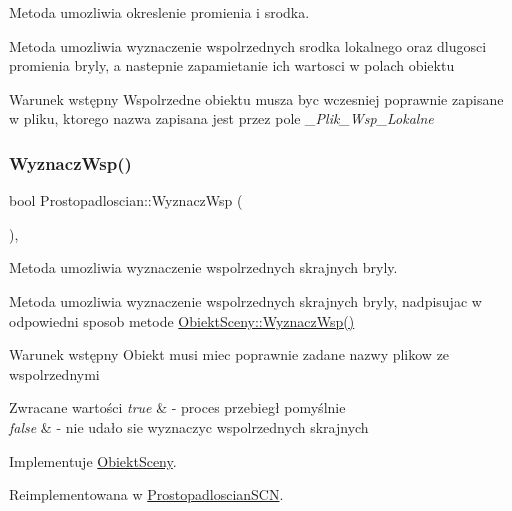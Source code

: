 Metoda umozliwia okreslenie promienia i srodka. 

Metoda umozliwia wyznaczenie wspolrzednych srodka lokalnego oraz dlugosci promienia bryly, a nastepnie zapamietanie ich wartosci w polach obiektu \begin{DoxyPrecond}{Warunek wstępny}
Wspolrzedne obiektu musza byc wczesniej poprawnie zapisane w pliku, ktorego nazwa zapisana jest przez pole {\itshape \+\_\+\+Plik\+\_\+\+Wsp\+\_\+\+Lokalne} 
\end{DoxyPrecond}
\mbox{\label{classProstopadloscian_a9d182fd3d875a1e3928c8972727be6fe}} 
\subsubsection{\texorpdfstring{Wyznacz\+Wsp()}{WyznaczWsp()}}
{\footnotesize\ttfamily bool Prostopadloscian\+::\+Wyznacz\+Wsp (\begin{DoxyParamCaption}{ }\end{DoxyParamCaption})\hspace{0.3cm}{\ttfamily [override]}, {\ttfamily [virtual]}}



Metoda umozliwia wyznaczenie wspolrzednych skrajnych bryly. 

Metoda umozliwia wyznaczenie wspolrzednych skrajnych bryly, nadpisujac w odpowiedni sposob metode \hyperlink{classObiektSceny_a24dd0332c0755d7155128639a9a3e2b4}{Obiekt\+Sceny\+::\+Wyznacz\+Wsp()}

\begin{DoxyPrecond}{Warunek wstępny}
Obiekt musi miec poprawnie zadane nazwy plikow ze wspolrzednymi 
\end{DoxyPrecond}

\begin{DoxyRetVals}{Zwracane wartości}
{\em true} & -\/ proces przebiegł pomyślnie \\
\hline
{\em false} & -\/ nie udało sie wyznaczyc wspolrzednych skrajnych \\
\hline
\end{DoxyRetVals}


Implementuje \hyperlink{classObiektSceny_a24dd0332c0755d7155128639a9a3e2b4}{Obiekt\+Sceny}.



Reimplementowana w \hyperlink{classProstopadloscianSCN_acdd4a5c10fb6347ad65b1a516ee83b01}{Prostopadloscian\+S\+CN}.



